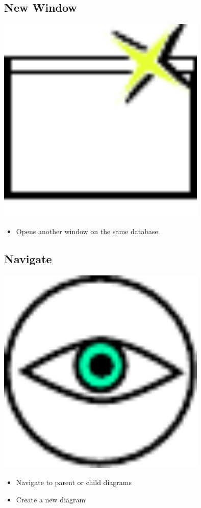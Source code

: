 \subsection{New Window}

\includegraphics[width=10cm]{../../gui/source/resources/file_new_window.pdf}
\begin{itemize}
\item Opens another window on the same database.
\end{itemize}

\subsection{Navigate}

\includegraphics[width=10cm]{../../gui/source/resources/tool_navigate.pdf}
\begin{itemize}
\item Navigate to parent or child diagrams
\item Create a new diagram
\end{itemize}

